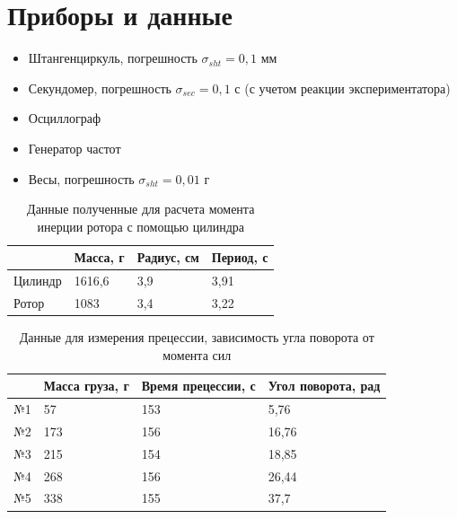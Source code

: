 \documentclass[a4paper]{article}
\begin{document}
\section{Приборы и данные}
\begin{itemize}
    \item Штангенциркуль, погрешность $\sigma_{sht} = 0,1 $ мм
    \item Секундомер, погрешность $\sigma_{sec} = 0,1 $ с (с учетом реакции экспериментатора)
    \item Осциллограф
    \item Генератор частот
    \item Весы, погрешность $\sigma_{sht} = 0,01$ г
\end{itemize}

\begin{table}[!h]
\begin{center}
\begin{tabular}{|l|l|l|l|}
\hline
        & Масса, г & Радиус, см & Период, с \\ \hline
Цилиндр & 1616,6   & 3,9        & 3,91      \\ \hline
Ротор   & 1083     & 3,4        & 3,22      \\ \hline
\end{tabular}
\caption{Данные полученные для расчета момента инерции ротора с помощью цилиндра}
\end{center}
\end{table}

\begin{table}[!h]
\begin{center}
\begin{tabular}{|l|l|l|l|}
\hline
   & Масса груза, г & Время прецессии, с & Угол поворота, рад \\ \hline
№1 & 57             & 153                & 5,76               \\ \hline
№2 & 173            & 156                & 16,76              \\ \hline
№3 & 215            & 154                & 18,85              \\ \hline
№4 & 268            & 156                & 26,44              \\ \hline
№5 & 338            & 155                & 37,7               \\ \hline
\end{tabular}
\caption{Данные для измерения прецессии, зависимость угла поворота от момента сил}
\end{center}
\end{table}
\end{document}
